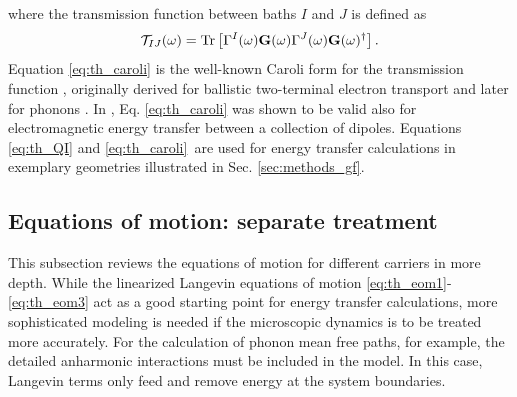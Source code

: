where the transmission function between baths $I$ and $J$ is defined as
\begin{equation}
 \mathcal{T}_{IJ}(\omega) = \textrm{Tr}\left[\Gamma^I(\omega) \mathbf{G}(\omega) \Gamma^J(\omega) \mathbf{G}(\omega)^{\dagger} \right]. \label{eq:th_caroli}
\end{equation}
Equation \eqref{eq:th_caroli} is the well-known Caroli form for the transmission function \cite{caroli71}, originally derived for ballistic two-terminal electron transport and later for phonons \cite{mingo06,yamamoto06}. In , Eq. \eqref{eq:th_caroli} was shown to be valid also for electromagnetic energy transfer between a collection of dipoles. Equations \eqref{eq:th_QI} and \eqref{eq:th_caroli} are used for energy transfer calculations in exemplary geometries illustrated in Sec. \ref{sec:methods_gf}.



\subsection{Equations of motion: separate treatment}
\label{sec:th_eom2}

This subsection reviews the equations of motion for different carriers in more depth. While the linearized Langevin equations of motion \eqref{eq:th_eom1}-\eqref{eq:th_eom3} act as a good starting point for energy transfer calculations, more sophisticated modeling is needed if the microscopic dynamics is to be treated more accurately. For the calculation of phonon mean free paths, for example, the detailed anharmonic interactions must be included in the model. In this case, Langevin terms only feed and remove energy at the system boundaries. %

